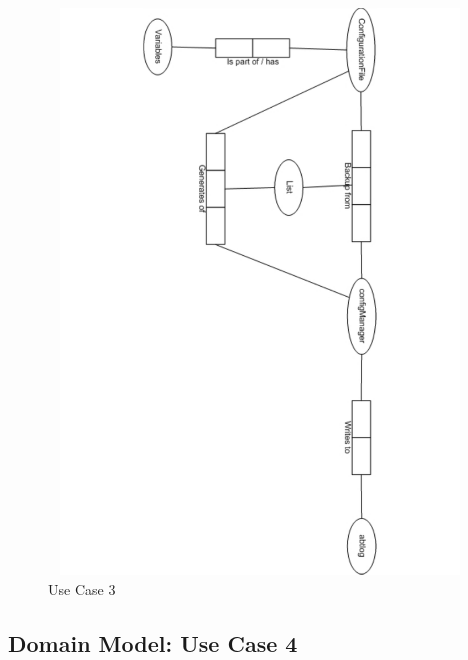 \begin{figure}[htbp]
  \centering
  \includegraphics[angle=90,width=15cm,height=15cm]{"domainmodel-usecase3"}
  \caption{Use Case 3}
  \label{fig:usecase3}
\end{figure}

\newpage
\subsection{Domain Model: Use Case 4}

